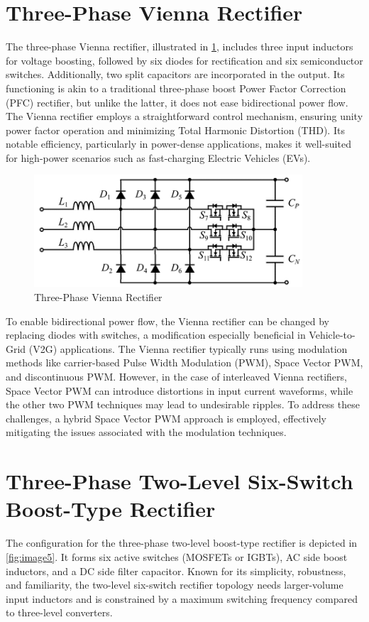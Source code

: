 \documentclass[12pt,a4paper]{book}
\begin{document}
\section{Three-Phase Vienna Rectifier}
The three-phase Vienna rectifier, illustrated in \ref{fig:image4}, includes three input inductors for voltage boosting, followed by six diodes for rectification and six semiconductor switches. Additionally, two split capacitors are incorporated in the output. Its functioning is akin to a traditional three-phase boost Power Factor Correction (PFC) rectifier, but unlike the latter, it does not ease bidirectional power flow. The Vienna rectifier employs a straightforward control mechanism, ensuring unity power factor operation and minimizing Total Harmonic Distortion (THD). Its notable efficiency, particularly in power-dense applications, makes it well-suited for high-power scenarios such as fast-charging Electric Vehicles (EVs).

\begin{figure}[h]
  \centering
  \includegraphics[width=10cm]{image4.png}
  \caption{Three-Phase Vienna Rectifier}
  \label{fig:image4}
\end{figure}

To enable bidirectional power flow, the Vienna rectifier can be changed by replacing diodes with switches, a modification especially beneficial in Vehicle-to-Grid (V2G) applications. The Vienna rectifier typically runs using modulation methods like carrier-based Pulse Width Modulation (PWM), Space Vector PWM, and discontinuous PWM. However, in the case of interleaved Vienna rectifiers, Space Vector PWM can introduce distortions in input current waveforms, while the other two PWM techniques may lead to undesirable ripples. To address these challenges, a hybrid Space Vector PWM approach is employed, effectively mitigating the issues associated with the modulation techniques.

\section{Three-Phase Two-Level Six-Switch Boost-Type Rectifier}
The configuration for the three-phase two-level boost-type rectifier is depicted in \ref{fig:image5}. It forms six active switches (MOSFETs or IGBTs), AC side boost inductors, and a DC side filter capacitor. Known for its simplicity, robustness, and familiarity, the two-level six-switch rectifier topology needs larger-volume input inductors and is constrained by a maximum switching frequency compared to three-level converters.
\end{document}

